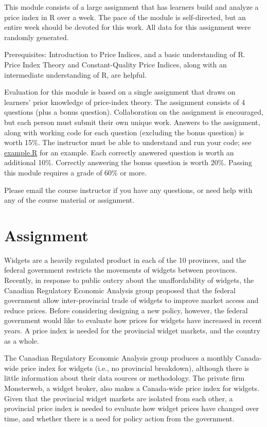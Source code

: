 \documentclass[]{article}
\begin{document}
This module consists of a large assignment that has learners build and analyze a price index in R over a week. The pace of the module is self-directed, but an entire week should be devoted for this work. All data for this assignment were randomly generated.

Prerequisites: Introduction to Price Indices, and a basic understanding of R. Price Index Theory and Constant-Quality Price Indices, along with an intermediate understanding of R, are helpful.

Evaluation for this module is based on a single assignment that draws on learners' prior knowledge of price-index theory. The assignment consists of 4 questions (plus a bonus question). Collaboration on the assignment is encouraged, but each person must submit their own unique work. Answers to the assignment, along with working code for each question (excluding the bonus question) is worth 15\%. The instructor must be able to understand and run your code; see \href{scripts/example.R}{example.R} for an example. Each correctly answered question is worth an additional 10\%. Correctly answering the bonus question is worth 20\%. Passing this module requires a grade of 60\% or more.

Please email the course instructor if you have any questions, or need help with any of the course material or assignment.

\hypertarget{assignment-3}{%
\section{Assignment}\label{assignment-3}}

Widgets are a heavily regulated product in each of the 10 provinces, and the federal government restricts the movements of widgets between provinces. Recently, in response to public outcry about the unaffordability of widgets, the Canadian Regulatory Economic Analysis group proposed that the federal government allow inter-provincial trade of widgets to improve market access and reduce prices. Before considering designing a new policy, however, the federal government would like to evaluate how prices for widgets have increased in recent years. A price index is needed for the provincial widget markets, and the country as a whole.

The Canadian Regulatory Economic Analysis group produces a monthly Canada-wide price index for widgets (i.e., no provincial breakdown), although there is little information about their data sources or methodology. The private firm Monsterweb, a widget broker, also makes a Canada-wide price index for widgets. Given that the provincial widget markets are isolated from each other, a provincial price index is needed to evaluate how widget prices have changed over time, and whether there is a need for policy action from the government.
\end{document}
